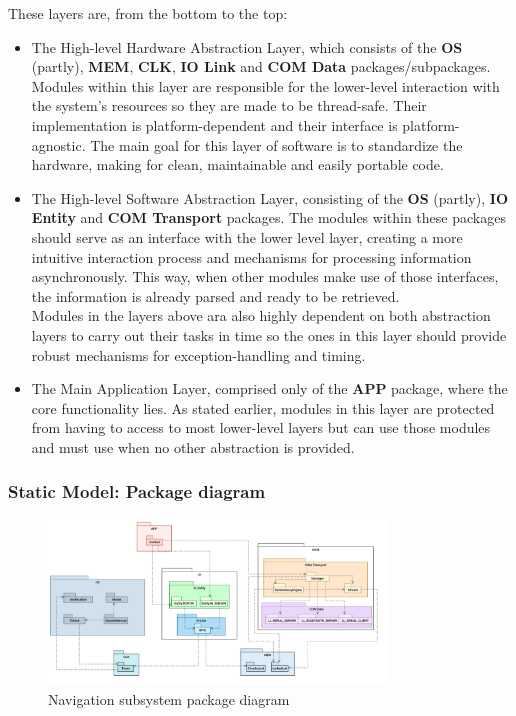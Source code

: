 These layers are, from the bottom to the top:
\begin{itemize}
	\item The High-level Hardware Abstraction Layer, which consists of the \textbf{OS} (partly), \textbf{MEM}, \textbf{CLK}, \textbf{IO Link} and \textbf{COM Data} packages/subpackages. Modules within this layer are responsible for the lower-level interaction with the system's resources so they are made to be thread-safe. Their implementation is platform-dependent and their interface is platform-agnostic. The main goal for this layer of software is to standardize the hardware, making for clean, maintainable and easily portable code. 
	\item The High-level Software Abstraction Layer, consisting of the \textbf{OS} (partly), \textbf{IO Entity} and \textbf{COM Transport} packages. The modules within these packages should serve as an interface with the lower level layer, creating a more intuitive interaction process and mechanisms for processing information asynchronously. This way, when other modules make use of those interfaces, the information is already parsed and ready to be retrieved.\\
	Modules in the layers above ara also highly dependent on both abstraction layers to carry out their tasks in time so the ones in this layer should provide robust mechanisms for exception-handling and timing. 
	\item The Main Application Layer, comprised only of the \textbf{APP} package, where the core functionality lies. As stated earlier, modules in this layer are protected from having to access to most lower-level layers but can use those modules and must use when no other abstraction is provided.
\end{itemize}


\subsubsection{Static Model: Package diagram}

\begin{figure}[H]
	\centering
	\includegraphics[width=0.8\textwidth]{./img/navig-package-diagram.png}
	\caption {Navigation subsystem package diagram}
	\label{fig:navig-package-diagram}
	\end{figure}



